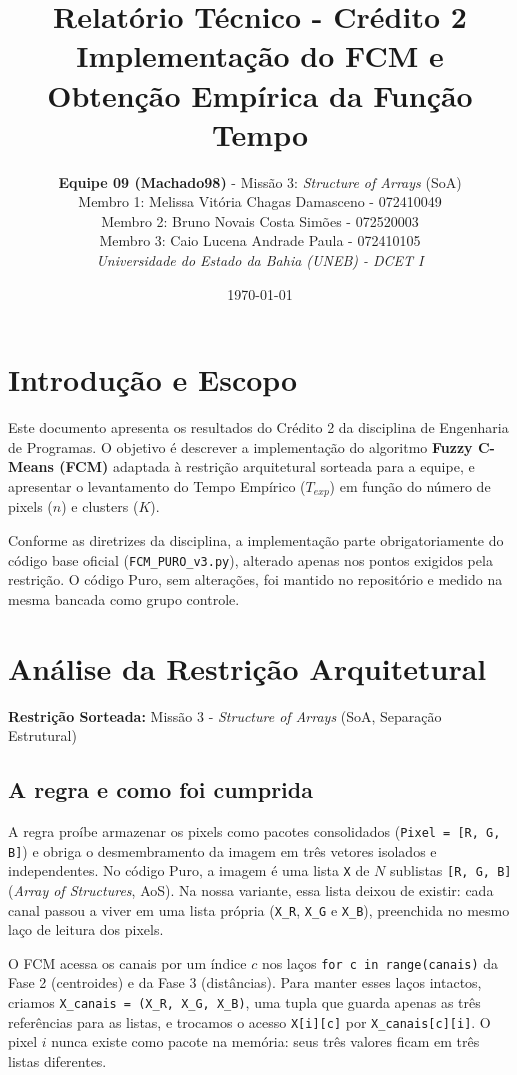 \documentclass[11pt,a4paper]{article}
\title{\textbf{Relatório Técnico - Crédito 2}\\ \Large{Implementação do FCM e Obtenção Empírica da Função Tempo}}
\author{
    \textbf{Equipe 09 (Machado98)} - Missão 3: \textit{Structure of Arrays} (SoA) \\
    Membro 1: Melissa Vitória Chagas Damasceno - 072410049 \\
    Membro 2: Bruno Novais Costa Simões - 072520003 \\
    Membro 3: Caio Lucena Andrade Paula - 072410105 \\
    \textit{Universidade do Estado da Bahia (UNEB) - DCET I}
}
\date{\today}
\begin{document}
\maketitle

\section{Introdução e Escopo}
Este documento apresenta os resultados do Crédito 2 da disciplina de Engenharia de Programas. O objetivo é descrever a implementação do algoritmo \textbf{Fuzzy C-Means (FCM)} adaptada à restrição arquitetural sorteada para a equipe, e apresentar o levantamento do Tempo Empírico ($T_{exp}$) em função do número de pixels ($n$) e clusters ($K$).

Conforme as diretrizes da disciplina, a implementação parte obrigatoriamente do código base oficial (\texttt{FCM\_PURO\_v3.py}), alterado apenas nos pontos exigidos pela restrição. O código Puro, sem alterações, foi mantido no repositório e medido na mesma bancada como grupo controle.

\section{Análise da Restrição Arquitetural}
\textbf{Restrição Sorteada:} Missão 3 - \textit{Structure of Arrays} (SoA, Separação Estrutural)

\subsection{A regra e como foi cumprida}
A regra proíbe armazenar os pixels como pacotes consolidados (\texttt{Pixel = [R, G, B]}) e obriga o desmembramento da imagem em três vetores isolados e independentes. No código Puro, a imagem é uma lista \texttt{X} de $N$ sublistas \texttt{[R, G, B]} (\textit{Array of Structures}, AoS). Na nossa variante, essa lista deixou de existir: cada canal passou a viver em uma lista própria (\texttt{X\_R}, \texttt{X\_G} e \texttt{X\_B}), preenchida no mesmo laço de leitura dos pixels.

O FCM acessa os canais por um índice $c$ nos laços \texttt{for c in range(canais)} da Fase 2 (centroides) e da Fase 3 (distâncias). Para manter esses laços intactos, criamos \texttt{X\_canais = (X\_R, X\_G, X\_B)}, uma tupla que guarda apenas as três referências para as listas, e trocamos o acesso \texttt{X[i][c]} por \texttt{X\_canais[c][i]}. O pixel $i$ nunca existe como pacote na memória: seus três valores ficam em três listas diferentes.
\end{document}
